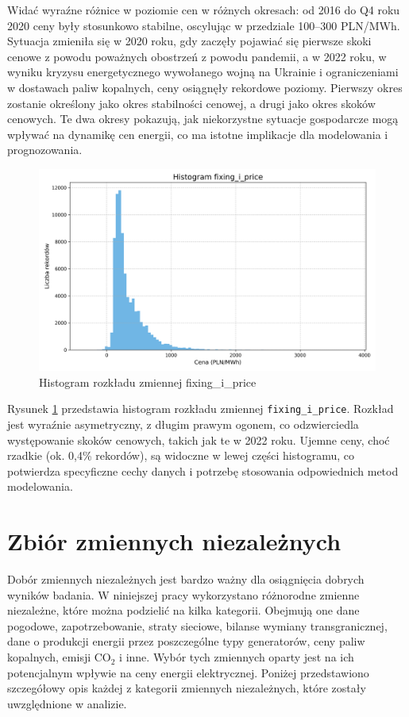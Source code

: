 Widać wyraźne różnice w poziomie cen w różnych okresach: od 2016 do Q4 roku 2020 ceny były stosunkowo stabilne, oscylując w przedziale 100–300 PLN/MWh. Sytuacja zmieniła się w 2020 roku, gdy zaczęły pojawiać się pierwsze skoki cenowe z powodu poważnych obostrzeń z powodu pandemii, a w 2022 roku, w wyniku kryzysu energetycznego wywołanego wojną na Ukrainie i ograniczeniami w dostawach paliw kopalnych, ceny osiągnęły rekordowe poziomy. Pierwszy okres zostanie określony jako okres stabilności cenowej, a drugi jako okres skoków cenowych. Te dwa okresy pokazują, jak niekorzystne sytuacje gospodarcze mogą wpływać na dynamikę cen energii, co ma istotne implikacje dla modelowania i prognozowania.

\begin{figure}
    \centering
    \includegraphics[width=\textwidth]{../plots/fixing_i_price_histogram.png}
    \caption{Histogram rozkładu zmiennej fixing\_i\_price}
    \label{fig:fixing-i-price-histogram}
\end{figure}

Rysunek \ref{fig:fixing-i-price-histogram} przedstawia histogram rozkładu zmiennej \texttt{fixing\_i\_price}. Rozkład jest wyraźnie asymetryczny, z długim prawym ogonem, co odzwierciedla występowanie skoków cenowych, takich jak te w 2022 roku. Ujemne ceny, choć rzadkie (ok. 0,4\% rekordów), są widoczne w lewej części histogramu, co potwierdza specyficzne cechy danych i potrzebę stosowania odpowiednich metod modelowania.

\section{Zbiór zmiennych niezależnych}
Dobór zmiennych niezależnych jest bardzo ważny dla osiągnięcia dobrych wyników badania. W niniejszej pracy wykorzystano różnorodne zmienne niezależne, które można podzielić na kilka kategorii. Obejmują one dane pogodowe, zapotrzebowanie, straty sieciowe, bilanse wymiany transgranicznej, dane o produkcji energii przez poszczególne typy generatorów, ceny paliw kopalnych, emisji CO$_2$ i inne. Wybór tych zmiennych oparty jest na ich potencjalnym wpływie na ceny energii elektrycznej. Poniżej przedstawiono szczegółowy opis każdej z kategorii zmiennych niezależnych, które zostały uwzględnione w analizie.

